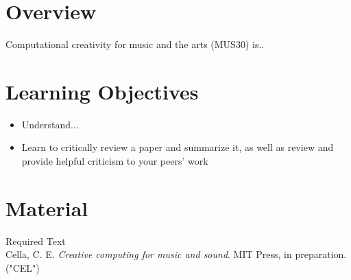 \documentclass[letterpaper]{inzane_syllabus} %
\begin{document}

\makeprofile %

\section{Overview}

Computational creativity for music and the arts (MUS30) is..



\vspace{0.5cm}
\section{Learning Objectives}

\begin{itemize}
\item Understand...
\item Learn to critically review a paper and summarize it, as well as review and provide helpful criticism to your peers' work

\end{itemize}

\vspace{0.5cm} %
\section{Material}

{\color{myCOLOR} Required Text}\\
Cella, C. E. \textit{Creative computing for music and sound}. MIT Press, in preparation. ("CEL") \\
\end{document}
